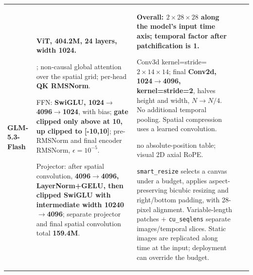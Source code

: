 \begin{longtable}{@{}P{0.100\dimexpr\textwidth-40pt\relax}P{0.230\dimexpr\textwidth-40pt\relax}P{0.290\dimexpr\textwidth-40pt\relax}P{0.240\dimexpr\textwidth-40pt\relax}P{0.140\dimexpr\textwidth-40pt\relax}@{}}
{\bfseries GLM-\allowbreak{}5.\allowbreak{}3-\allowbreak{}Flash} & {\bfseries ViT, 404.\allowbreak{}2M, 24 layers, width 1024.\allowbreak{}}\par{}; non-\allowbreak{}causal global attention over the spatial grid; per-\allowbreak{}head {\bfseries QK RMSNorm}.\allowbreak{}\par\vspace{1pt}FFN: {\bfseries SwiGLU, 1024\(\rightarrow\)4096\(\rightarrow\)1024}, with bias; {\bfseries gate clipped only above at 10, up clipped to [-\allowbreak{}10,10]}; pre-\allowbreak{}RMSNorm and final encoder RMSNorm, \(\epsilon=10^{-5}\).\allowbreak{}\par\vspace{1pt}Projector: after spatial convolution, {\bfseries 4096\(\rightarrow\)4096, LayerNorm+GELU, then clipped SwiGLU with intermediate width 10240\(\rightarrow\)4096}; separate projector and final spatial convolution total {\bfseries 159.\allowbreak{}4M}.\allowbreak{} & {\bfseries Overall: \(2\times 28\times 28\) along the model's input time axis; temporal factor after patchification is 1.\allowbreak{}}\par{} Conv3d kernel=\allowbreak{}stride=\allowbreak{}\(2\times 14\times 14\); final {\bfseries Conv2d, 1024\(\rightarrow\)4096, kernel=\allowbreak{}stride=\allowbreak{}2}, halves height and width, {\bfseries \(N\rightarrow N/4\)}.\allowbreak{} No additional temporal pooling.\allowbreak{} Spatial compression uses a learned convolution.\allowbreak{}\par\vspace{1pt}{\bfseries Position:} no absolute-\allowbreak{}position table; visual 2D axial RoPE.\allowbreak{}\par{} \texttt{smart\_\allowbreak{}resize} selects a canvas under a budget, applies aspect-\allowbreak{}preserving bicubic resizing and right/\allowbreak{}bottom padding, with 28-\allowbreak{}pixel alignment.\allowbreak{} Variable-\allowbreak{}length patches + \texttt{cu\_\allowbreak{}seqlens} separate images/\allowbreak{}temporal slices.\allowbreak{} Static images are replicated along time at the input; deployment can override the budget.\allowbreak{} & \textemdash{} & \textemdash{} \\

\end{longtable}
